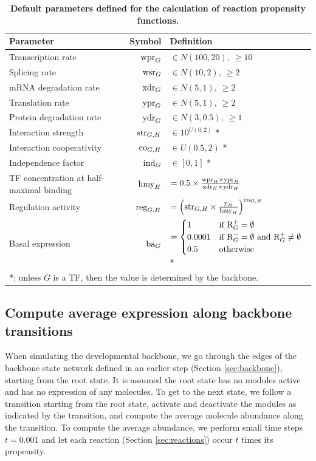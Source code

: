 \begin{table}[ht]
	\caption{\textbf{Default parameters defined for the calculation of reaction propensity functions.}} \label{tab:reaction_params}
	\centering
	\begin{tabular}{|lrl|}
		\hline
		Parameter & Symbol & Definition \\ \hline \hline
		Transcription rate & $\text{wpr}_{G}$ & $\in N(100, 20),\ \geq 10$ \\
		Splicing rate & $\text{wsr}_{G}$ & $\in N(10, 2),\ \geq 2$ \\
		mRNA degradation rate & $\text{xdr}_{G}$ & $\in N(5, 1),\ \geq 2$ \\
		Translation rate & $\text{ypr}_{G}$ & $\in N(5, 1),\ \geq 2$ \\
		Protein degradation rate & $\text{ydr}_{G}$ & $\in N(3, 0.5),\ \geq 1$ \\
		Interaction strength & $\text{str}_{G,H}$ & $\in 10^{U(0, 2)}$ * \\ 
		Interaction cooperativity & $\text{co}_{G,H}$ & $\in U(0.5, 2)$ * \\
    Independence factor & $\text{ind}_{G}$ & $\in [0, 1]$ * \\ \hline\hline
		TF concentration at half-maximal binding & $\text{hmy}_{H}$ & $= 0.5 \times \frac{\text{wpr}_{H} \times \text{ypr}_{H}}{\text{xdr}_{H} \times \text{ydr}_{H}}$ \\ 
		Regulation activity & $\text{reg}_{G,H}$ & $= \left(\text{str}_{G,H} \times \frac{\text{y}_{H}}{\text{hmy}_{H}}\right) ^ {\text{co}_{G,H}}$ \\
		Basal expression & $\text{ba}_{G}$ & $= \begin{cases} 1 & \mbox{if } \text{R}^+_{G} = \emptyset \\ 0.0001 & \mbox{if } \text{R}^-_{G} = \emptyset \mbox{ and } \text{R}^+_{G} \neq \emptyset \\ 0.5 & \mbox{otherwise} \end{cases}$ * \\ \hline
		\multicolumn{3}{l}{*: unless $G$ is a TF, then the value is determined by the backbone.}
	\end{tabular}
\end{table}

\subsection{Compute average expression along backbone transitions} \label{sec:dyngen_sim_backbone}
When simulating the developmental backbone, we go through the edges of the backbone state network defined in an earlier step (Section \ref{sec:backbone}), starting from the root state. It is assumed the root state has no modules active and has no expression of any molecules. To get to the next state, we follow a transition starting from the root state, activate and deactivate the modules as indicated by the transition, and compute the average molecule abundance along the transition. To compute the average abundance, we perform small time steps $t = 0.001$ and let each reaction (Section \ref{sec:reactions}) occur $t$ times its propensity. 

